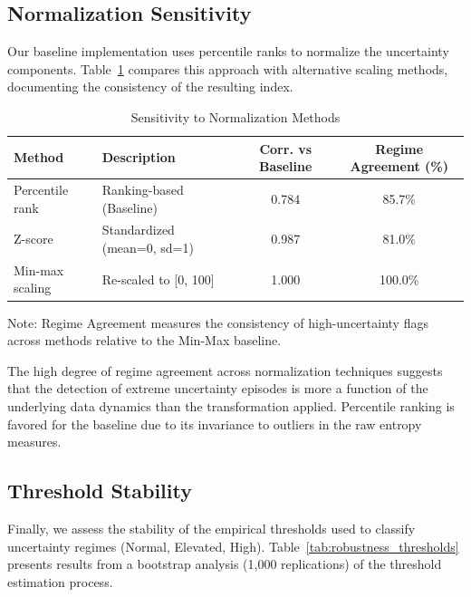 \documentclass[12pt,a4paper]{article}
\theoremstyle{remark}
\begin{document}
\subsection{Normalization Sensitivity}

Our baseline implementation uses percentile ranks to normalize the uncertainty components. Table~\ref{tab:robustness_normalization} compares this approach with alternative scaling methods, documenting the consistency of the resulting index.

\begin{table}[h]
\centering
\begin{threeparttable}
\caption{Sensitivity to Normalization Methods}
\label{tab:robustness_normalization}
\begin{tabular}{llcc}
\toprule
Method & Description & Corr. vs Baseline & Regime Agreement (\%) \\
\midrule
Percentile rank & Ranking-based (Baseline) & 0.784 & 85.7\% \\
Z-score & Standardized (mean=0, sd=1) & 0.987 & 81.0\% \\
Min-max scaling & Re-scaled to [0, 100] & 1.000 & 100.0\% \\
\bottomrule
\end{tabular}
\begin{tablenotes}
  \small \item Note: Regime Agreement measures the consistency of high-uncertainty flags across methods relative to the Min-Max baseline.
\end{tablenotes}
\end{threeparttable}
\end{table}

The high degree of regime agreement across normalization techniques suggests that the detection of extreme uncertainty episodes is more a function of the underlying data dynamics than the transformation applied. Percentile ranking is favored for the baseline due to its invariance to outliers in the raw entropy measures.

\subsection{Threshold Stability}

Finally, we assess the stability of the empirical thresholds used to classify uncertainty regimes (Normal, Elevated, High). Table~\ref{tab:robustness_thresholds} presents results from a bootstrap analysis (1,000 replications) of the threshold estimation process.
\end{document}
